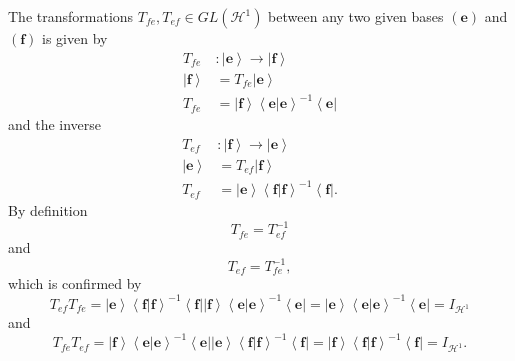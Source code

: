 \documentclass[aps,preprint]{revtex4}%
\begin{document}
The transformations $T_{fe},T_{ef}\in GL\left(  \mathcal{H}^{1}\right)  $
between any two given bases $\left(  \mathbf{e}\right)  $ and $\left(
\mathbf{f}\right)  $ is given by
\begin{align}
T_{fe}  &  :\left\vert \mathbf{e}\right\rangle \rightarrow\left\vert
\mathbf{f}\right\rangle \\
\left\vert \mathbf{f}\right\rangle  &  =T_{fe}\left\vert \mathbf{e}%
\right\rangle \\
T_{fe}  &  =\left\vert \mathbf{f}\right\rangle \left\langle \left.
\mathbf{e}\right\vert \mathbf{e}\right\rangle ^{-1}\left\langle \mathbf{e}%
\right\vert
\end{align}
and the inverse%
\begin{align}
T_{ef}  &  :\left\vert \mathbf{f}\right\rangle \rightarrow\left\vert
\mathbf{e}\right\rangle \\
\left\vert \mathbf{e}\right\rangle  &  =T_{ef}\left\vert \mathbf{f}%
\right\rangle \\
T_{ef}  &  =\left\vert \mathbf{e}\right\rangle \left\langle \left.
\mathbf{f}\right\vert \mathbf{f}\right\rangle ^{-1}\left\langle \mathbf{f}%
\right\vert .
\end{align}
By definition
\begin{equation}
T_{fe}=T_{ef}^{-1}%
\end{equation}
and
\begin{equation}
T_{ef}=T_{fe}^{-1},
\end{equation}
which is confirmed by
\begin{equation}
T_{ef}T_{fe}=\left\vert \mathbf{e}\right\rangle \left\langle \left.
\mathbf{f}\right\vert \mathbf{f}\right\rangle ^{-1}\left\langle \mathbf{f}%
\right\vert \left\vert \mathbf{f}\right\rangle \left\langle \left.
\mathbf{e}\right\vert \mathbf{e}\right\rangle ^{-1}\left\langle \mathbf{e}%
\right\vert =\left\vert \mathbf{e}\right\rangle \left\langle \left.
\mathbf{e}\right\vert \mathbf{e}\right\rangle ^{-1}\left\langle \mathbf{e}%
\right\vert =I_{\mathcal{H}^{1}}%
\end{equation}
and
\begin{equation}
T_{fe}T_{ef}=\left\vert \mathbf{f}\right\rangle \left\langle \left.
\mathbf{e}\right\vert \mathbf{e}\right\rangle ^{-1}\left\langle \mathbf{e}%
\right\vert \left\vert \mathbf{e}\right\rangle \left\langle \left.
\mathbf{f}\right\vert \mathbf{f}\right\rangle ^{-1}\left\langle \mathbf{f}%
\right\vert =\left\vert \mathbf{f}\right\rangle \left\langle \left.
\mathbf{f}\right\vert \mathbf{f}\right\rangle ^{-1}\left\langle \mathbf{f}%
\right\vert =I_{\mathcal{H}^{1}}.
\end{equation}
\end{document}
